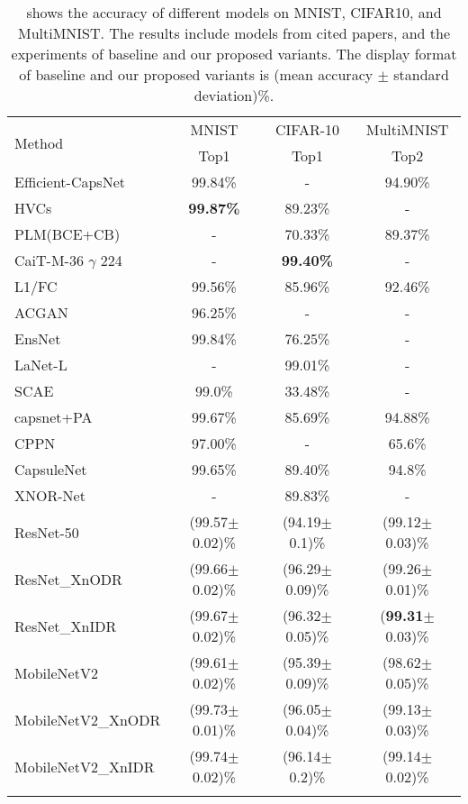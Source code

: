 \documentclass[sn-mathphys,iicol,Numbered]{sn-jnl}
\begin{document}
\begin{table*} [ht]
\centering
\caption{shows the accuracy of different models on MNIST, CIFAR10, and MultiMNIST. The results include models from cited papers, and the experiments of baseline and our proposed variants. The display format of baseline and our proposed variants is (mean accuracy $\pm$ standard deviation)\%.}
\begin{tabular}{l|c|c|c}
\toprule
\multirow{2}{*}{Method} & MNIST & CIFAR-10 & MultiMNIST \\
\cmidrule{2-4}
& Top1 & Top1 & Top2 \\
\midrule
Efficient-CapsNet~\citep{A7_efcaps} & 99.84\% & - & 94.90\% \\ 
HVCs~\citep{A8_hvcs} & \textbf{99.87\%} & 89.23\% & - \\
PLM(BCE+CB)~\citep{A12_plm} & - & 70.33\% & 89.37\% \\
CaiT-M-36 $\gamma$ 224~\citep{A6_cifar10sota_extra} & - & \textbf{99.40\%} & - \\
L1/FC~\citep{A13_rtdis_caps} & 99.56\% & 85.96\% & 92.46\% \\
ACGAN~\citep{A59_ACGAN} & 96.25\% & - & - \\
EnsNet~\citep{A9_ensnet} & 99.84\% & 76.25\% & - \\ 
LaNet-L~\citep{A5_cifar10sota} & - & 99.01\% & - \\
SCAE~\citep{A10_scae} & 99.0\% & 33.48\% & - \\
capsnet+PA~\citep{A14_capsPA} & 99.67\% & 85.69\% & 94.88\% \\
CPPN~\citep{A11_cvae} & 97.00\% & - & 65.6\% \\
CapsuleNet~\citep{A1_caps} & 99.65\% & 89.40\% & 94.8\% \\
XNOR-Net~\citep{A2_xnor} & - & 89.83\% & - \\
\midrule
ResNet-50 & (99.57$\pm$0.02)\% & (94.19$\pm$0.1)\% & (99.12$\pm$0.03)\%\\
ResNet\_XnODR & (99.66$\pm$0.02)\% & (96.29$\pm$0.09)\% & (99.26$\pm$0.01)\%\\
ResNet\_XnIDR & (99.67$\pm$0.02)\% & (96.32$\pm$0.05)\% & (\textbf{99.31}$\pm$0.03)\% \\
MobileNetV2 & (99.61$\pm$0.02)\% & (95.39$\pm$0.09)\% & (98.62$\pm$0.05)\% \\
MobileNetV2\_XnODR & (99.73$\pm$0.01)\% & (96.05$\pm$0.04)\% & (99.13$\pm$0.03)\% \\
MobileNetV2\_XnIDR & (99.74$\pm$0.02)\% & (96.14$\pm$0.2)\% & (99.14$\pm$0.02)\% \\
\botrule
\end{tabular} 
\label{tab:all-acc}
\end{table*}
\end{document}
